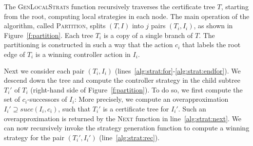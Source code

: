 The \textsc{GenLocalStrats} function recursively traverses the certificate tree $T$, starting from the root, computing local strategies in each node.  The main operation of the algorithm, called \textsc{Partition}, splits $(T,I)$ into $j$ pairs $(T_i, I_i)$, as shown in Figure~\ref{f:partition}.  Each tree $T_i$ is a copy of a single branch of $T$.  The partitioning is constructed in such a way that the action $c_i$ that labels the root edge of $T_i$ is a winning controller action in $I_i$.


Next we consider each pair $(T_i, I_i)$
(lines~\ref{alg:strat:for}-\ref{alg:strat:endfor}). We descend
down the tree and compute the controller strategy in the child
subtree $T_i'$ of $T_i$ (right-hand side of Figure~\ref{f:partition}).
To do so, we first compute the set of $c_i$-successors of $I_i$:
More precisely, we compute an overapproximation $I_i'\supseteq
succ(I_i, c_i)$, such that $T_i'$ is a certificate
tree for $I_i'$.  Such an overapproximation is returned by the
\textsc{Next} function in line~\ref{alg:strat:next}.  We can now
recursively invoke the strategy generation function to compute a
winning strategy for the pair $(T_i', I_i')$
(line~\ref{alg:strat:rec}).


